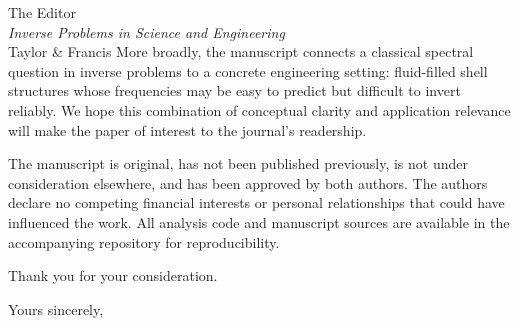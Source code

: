 \documentclass[11pt]{letter}
\begin{document}
\begin{letter}{%
  The Editor\\
  \textit{Inverse Problems in Science and Engineering}\\
  Taylor \& Francis}
More broadly, the manuscript connects a classical spectral question in inverse
problems to a concrete engineering setting: fluid-filled shell structures whose
frequencies may be easy to predict but difficult to invert reliably.  We hope
this combination of conceptual clarity and application relevance will make the
paper of interest to the journal's readership.

The manuscript is original, has not been published previously, is not under
consideration elsewhere, and has been approved by both authors.  The authors
declare no competing financial interests or personal relationships that could
have influenced the work.  All analysis code and manuscript sources are
available in the accompanying repository for reproducibility.

Thank you for your consideration.

\closing{Yours sincerely,}

\end{letter}
\end{document}
